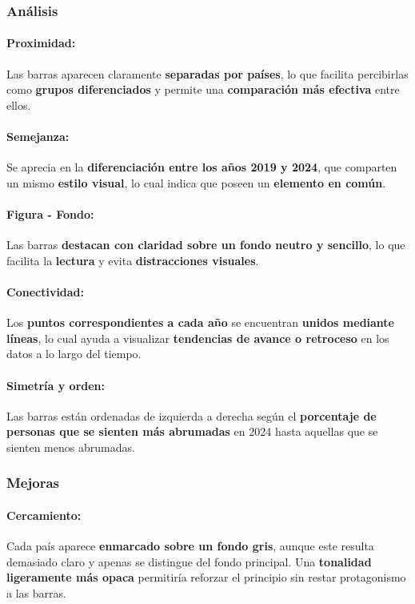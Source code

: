 \documentclass[12pt,a4paper]{article}
\begin{document}
\subsubsection{Análisis}

\paragraph{Proximidad:}
Las barras aparecen claramente \textbf{separadas por países}, lo que facilita percibirlas como \textbf{grupos diferenciados} y permite una \textbf{comparación más efectiva} entre ellos.

\paragraph{Semejanza:}
Se aprecia en la \textbf{diferenciación entre los años 2019 y 2024}, que comparten un mismo \textbf{estilo visual}, lo cual indica que poseen un \textbf{elemento en común}.

\paragraph{Figura - Fondo:}
Las barras \textbf{destacan con claridad sobre un fondo neutro y sencillo}, lo que facilita la \textbf{lectura} y evita \textbf{distracciones visuales}.

\paragraph{Conectividad:}
Los \textbf{puntos correspondientes a cada año} se encuentran \textbf{unidos mediante líneas}, lo cual ayuda a visualizar \textbf{tendencias de avance o retroceso} en los datos a lo largo del tiempo.

\paragraph{Simetría y orden:}
Las barras están ordenadas de izquierda a derecha según el \textbf{porcentaje de personas que se sienten más abrumadas} en 2024 hasta aquellas que se sienten menos abrumadas.

\subsubsection{Mejoras}

\paragraph{Cercamiento:}
Cada país aparece \textbf{enmarcado sobre un fondo gris}, aunque este resulta demasiado claro y apenas se distingue del fondo principal. Una \textbf{tonalidad ligeramente más opaca} permitiría reforzar el principio sin restar protagonismo a las barras.
\end{document}
